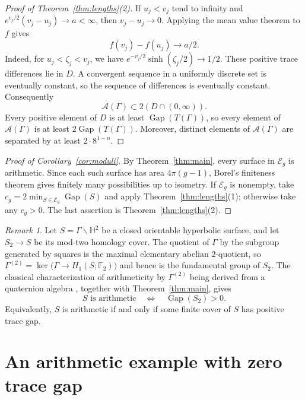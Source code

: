 \documentclass[reqno]{amsart}
\theoremstyle{remark}
\newtheorem{remark}[theorem]{Remark}
\DeclareMathOperator{\Gap}{Gap}
\begin{document}
\begin{proof}[Proof of Theorem~\ref{thm:lengths}(2)]
If $u_j<v_j$ tend to infinity and $e^{v_j/2}(v_j-u_j)\to a<\infty$, then $v_j-u_j\to0$. Applying the mean value theorem to $f$ gives
$$
f(v_j)-f(u_j)\longrightarrow a/2.
$$
Indeed, for $u_j<\zeta_j<v_j$, we have $e^{-v_j/2}\sinh(\zeta_j/2)\to1/2$. These positive trace differences lie in $D$. A convergent sequence in a uniformly discrete set is eventually constant, so the sequence of differences is eventually constant. Consequently
$$
\mathcal A(\Gamma)\subset 2(D\cap(0,\infty)).
$$
Every positive element of $D$ is at least $\Gap(T(\Gamma))$, so every element of $\mathcal A(\Gamma)$ is at least $2\Gap(T(\Gamma))$. Moreover, distinct elements of $\mathcal A(\Gamma)$ are separated by at least $2\cdot8^{1-n}$.
\end{proof}

\begin{proof}[Proof of Corollary~\ref{cor:moduli}]
By Theorem~\ref{thm:main}, every surface in $\mathcal E_g$ is arithmetic. Since each such surface has area $4\pi(g-1)$, Borel's finiteness theorem \cite[Theorem 8.2]{Borel} gives finitely many possibilities up to isometry. If $\mathcal E_g$ is nonempty, take $c_g=2\min_{S\in\mathcal E_g}\Gap(S)$ and apply Theorem~\ref{thm:lengths}(1); otherwise take any $c_g>0$. The last assertion is Theorem~\ref{thm:lengths}(2).
\end{proof}

\begin{remark}\label{rem:squarecover}
Let $S=\Gamma\backslash\mathbb H^2$ be a closed orientable hyperbolic surface, and let $S_2\to S$ be its mod-two homology cover. The quotient of $\Gamma$ by the subgroup generated by squares is the maximal elementary abelian $2$-quotient, so
$\Gamma^{(2)}=\ker\bigl(\Gamma\to H_1(S;\mathbb F_2)\bigr)$ and hence is the fundamental group of $S_2$. The classical characterization of arithmeticity by $\Gamma^{(2)}$ being derived from a quaternion algebra \cite[Theorem 5.3]{Reid}, together with Theorem~\ref{thm:main}, gives
$$
S\text{ is arithmetic}\quad\Longleftrightarrow\quad\Gap(S_2)>0.
$$
Equivalently, $S$ is arithmetic if and only if some finite cover of $S$ has positive trace gap.
\end{remark}

\section{An arithmetic example with zero trace gap}\label{sec:example}
\end{document}
